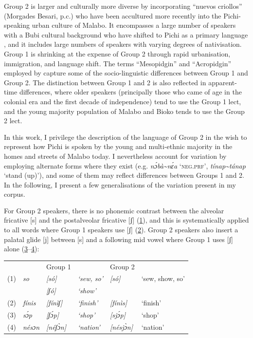 Group 2 is larger and culturally more diverse by incorporating “nuevos criollos” (Morgades Besari, p.c.) who have been accultured more recently into the Pichi-speaking urban culture of Malabo. It encompasses a large number of speakers with a Bubi cultural background who have shifted to Pichi as a primary language \citep{BolekiaBoleká2007}, and it includes large numbers of speakers with varying degrees of nativisation. Group 1 is shrinking at the expense of Group 2 through rapid urbanisation, immigration, and language shift. The terms “Mesopidgin” and “Acropidgin” employed by \citet{MorgadesBesari2011} capture some of the socio-linguistic differences between Group 1 and Group 2. The distinction between Group 1 and 2 is also reflected in apparent-time differences, where older speakers (principally those who came of age in the colonial era and the first decade of independence) tend to use the Group 1 lect, and the young majority population of Malabo and Bioko tends to use the Group 2 lect. 

In this work, I privilege the description of the language of Group 2 in the wish to represent how Pichi is spoken by the young and multi-ethnic majority in the homes and streets of Malabo today. I nevertheless account for variation by employing alternate forms where they exist (e.g. \textit{nɔ́bà{\textasciitilde}nɛ́a} ‘\textsc{neg.prf}’, \textit{tínap{\textasciitilde}tánap} ‘stand (up)’), and some of them may reflect differences between Groups 1 and 2. In the following, I present a few generalisations of the variation present in my corpus. 

For Group 2 speakers, there is no phonemic contrast between the alveolar fricative [s] and the postalveolar fricative [ʃ] (\hyperref[ex:0.1]{1}), and this is systematically applied to all words where Group 1 speakers use [ʃ] (\hyperref[ex:0.2]{2}). Group 2 speakers also insert a palatal glide [j] between [s] and a following mid vowel where Group 1 uses [ʃ] alone (\hyperref[ex:0.3]{3}--\hyperref[ex:0.4]{4}):





\bigskip
\noindent\begin{tabularx}{\textwidth}{l llX lX}
 &  & Group 1 &  & Group 2 & \\
(1) \label{ex:0.1}
         & \itshape so & \itshape \textup{[só]} & \itshape \textup{‘sew, so’} & \itshape \textup{[só]}  & ‘sew, show, so’\\
&  & \itshape \textup{[ʃó]}  & \itshape \textup{‘show’} &  & \\
(2) \label{ex:0.2}
         & \itshape fínis & \itshape \textup{[fínìʃ]} & \itshape \textup{‘finish’} & \itshape \textup{[fínìs]} & ‘finish’\\
(3) \label{ex:0.3}
         & \itshape sɔ́p & \itshape \textup{[ʃɔ́p]} & \itshape \textup{‘shop’} & \itshape \textup{[sjɔ́p]} & ‘shop’\\
(4) \label{ex:0.4}
         & \itshape nésɔn & \itshape \textup{[néʃɔ̀n]} & \itshape \textup{‘nation’} & \itshape \textup{[nésjɔ̀n]} & ‘nation’\\
\end{tabularx}

